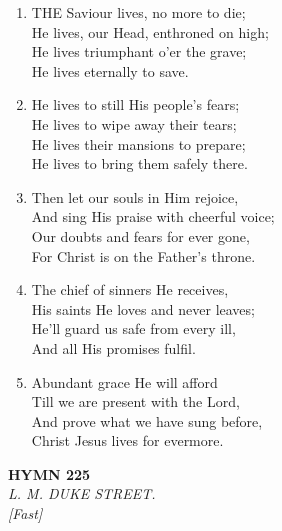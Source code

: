 \documentclass[11pt,a4paper]{article}
\begin{document}
\begin{enumerate}
    \item THE Saviour lives, no more to die; \\
        He lives, our Head, enthroned on high; \\
        He lives triumphant o'er the grave; \\
        He lives eternally to save.

    \item He lives to still His people's fears; \\
        He lives to wipe away their tears; \\
        He lives their mansions to prepare; \\
        He lives to bring them safely there.

    \item Then let our souls in Him rejoice, \\
        And sing His praise with cheerful voice; \\
        Our doubts and fears for ever gone, \\
        For Christ is on the Father's throne.

    \item The chief of sinners He receives, \\
        His saints He loves and never leaves; \\
        He'll guard us safe from every ill, \\
        And all His promises fulfil.

    \item Abundant grace He will afford \\
        Till we are present with the Lord, \\
        And prove what we have sung before, \\
        Christ Jesus lives for evermore.

\end{enumerate}

\newpage
\begin{center}
    {\Large \textbf{HYMN 225}}
    \\
    \textit{L. M. DUKE STREET.}
    \\
    \textit{\small [Fast]}
\end{center}
\vspace{1em}
\end{document}
